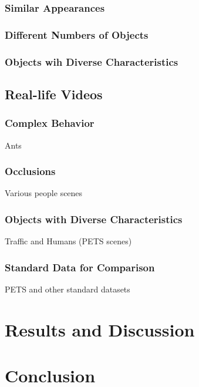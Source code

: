 \documentclass{article}
\begin{document}
\subsubsection{Similar Appearances}

\subsubsection{Different Numbers of Objects}

\subsubsection{Objects wih Diverse Characteristics}






\subsection{Real-life Videos}

\subsubsection{Complex Behavior}
%
Ants

\subsubsection{Occlusions}
%
Various people scenes

\subsubsection{Objects with Diverse Characteristics}
%
Traffic and Humans (PETS scenes)

\subsubsection{Standard Data for Comparison}
%
PETS and other standard datasets




\section*{Results and Discussion}





\section*{Conclusion}















% 
%  
\end{document}
